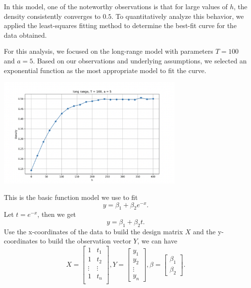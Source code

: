 \documentclass[11pt]{book}
\begin{document}
In this model, one of the noteworthy observations is that for large values of $h$, the density consistently converges to $0.5$. To quantitatively analyze this behavior, we applied the least-squares fitting method to determine the best-fit curve for the data obtained.

For this analysis, we focused on the long-range model with parameters $T = 100$ and $a = 5$. Based on our observations and underlying assumptions, we selected an exponential function as the most appropriate model to fit the curve.

\begin{center}
\captionsetup{type=figure}
    \includegraphics[width=0.7\textwidth]{long range T=100, a=5.jpg}
    \label{fig13}
\end{center}
This is the basic function model we use to fit
\begin{equation}\label{basic_function_model1}
y=\beta_1+\beta_2e^{-x}.
\end{equation}
Let $t=e^{-x}$, then we get
\begin{equation}\label{basic_function_model2}
    y=\beta_1+\beta_2t.
\end{equation}
Use the x-coordinates of the data to build the design matrix $X$ and the y-coordinates to build the observation vector $Y$, we can have
$$
X=
\begin{bmatrix}
    1&t_1\\
    1&t_2\\
\vdots&\vdots\\
    1&t_n\\
\end{bmatrix},
Y=
\begin{bmatrix}
y_1\\
y_2\\
\vdots\\
y_n
\end{bmatrix},
\beta=
\begin{bmatrix}
\beta_1\\
\beta_2
\end{bmatrix}.
$$
\end{document}
